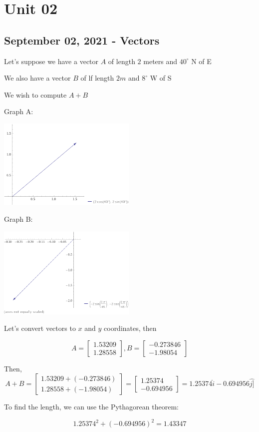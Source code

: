 \documentclass{scrreprt} %
\begin{document}
\section{Unit 02}

\subsection{September 02, 2021 - Vectors}

\begin{remark}
Let's suppose we have a vector $A$ of length $2$ meters and $40^{\circ}$ N of E

We also have a vector $B$ of lf length $2m$ and $8^\circ$ W of S

We wish to compute $A + B$

Graph A:

\includegraphics[width=250px]{2021-09-02-09-01-20.png}

Graph B:

\includegraphics[width = 250px]{2021-09-02-09-04-43.png}

Let's convert vectors to $x$ and $y$ coordinates, then

$$A = \begin{bmatrix}1.53209\\1.28558\end{bmatrix},
  B = \begin{bmatrix}-0.273846\\-1.98054\end{bmatrix}$$

Then, $$A + B = \begin{bmatrix}1.53209+(-0.273846)\\1.28558+(-1.98054)\end{bmatrix}
              = \begin{bmatrix}1.25374\\-0.694956\end{bmatrix}
              = 1.25374\hat{i} - 0.694956\hat{j]}$$

To find the length, we can use the Pythagorean theorem:

$$1.25374^2 + (-0.694956)^2 = 1.43347$$

\end{remark}
\end{document}
